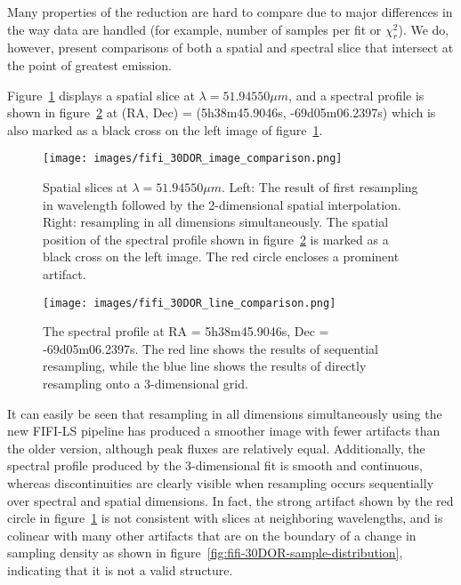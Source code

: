 Many properties of the reduction are hard to compare due to major differences in
the way data are handled (for example, number of samples per fit or $\chi_r^2$).
We do, however, present comparisons of both a spatial and spectral slice that
intersect at the point of greatest emission.

Figure~\ref{fig:fifi-30DOR-image-comparison} displays a spatial slice at
$\lambda = 51.94550 \mu m$, and a spectral profile is shown in
figure~\ref{fig:fifi-30DOR-line-comparison} at (RA, Dec) =
(5h38m45.9046s, -69d05m06.2397s) which is also marked as a black cross on the
left image of figure~\ref{fig:fifi-30DOR-image-comparison}.

\begin{figure}[H]
  \begin{center}
  \texttt{[image: images/fifi\_30DOR\_image\_comparison.png]}
  \caption{Spatial slices at $\lambda=51.94550\mu m$.  Left: The result of
           first resampling in wavelength followed by the 2-dimensional spatial
           interpolation.
           Right: resampling in all dimensions simultaneously.
           The spatial position of the spectral profile shown in
           figure~\ref{fig:fifi-30DOR-line-comparison} is marked as a black
           cross on the left image.  The red circle encloses a prominent
           artifact.}
  \label{fig:fifi-30DOR-image-comparison}
  \end{center}
\end{figure}

\begin{figure}[H]
  \begin{center}
  \texttt{[image: images/fifi\_30DOR\_line\_comparison.png]}
  \caption{The spectral profile at RA = 5h38m45.9046s, Dec = -69d05m06.2397s.
           The red line shows the results of sequential resampling, while the
           blue line shows the results of directly resampling onto a
           3-dimensional grid.}
  \label{fig:fifi-30DOR-line-comparison}
  \end{center}
\end{figure}

It can easily be seen that resampling in all dimensions simultaneously using
the new FIFI-LS pipeline has produced a smoother image with fewer artifacts
than the older version, although peak fluxes are relatively equal.
Additionally, the spectral profile produced by the 3-dimensional fit is smooth
and continuous, whereas discontinuities are clearly visible when resampling
occurs sequentially over spectral and spatial dimensions.
In fact, the strong artifact shown by the red circle in
figure~\ref{fig:fifi-30DOR-image-comparison} is not consistent with slices
at neighboring wavelengths, and is colinear with many other artifacts that
are on the boundary of a change in sampling density as shown in
figure~\ref{fig:fifi-30DOR-sample-distribution}, indicating that it is not a
valid structure.
